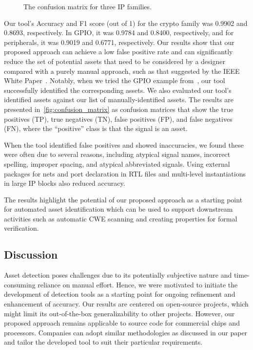 \begin{figure}[t]
\centering
{}\hfill
{}\hfill
{}
\caption{The confusion matrix for three IP families.\label{fig:confusion_matrix}
}
\end{figure}

Our tool's Accuracy and F1 score (out of 1) for the crypto family was 0.9902 and  0.8693, respectively. In GPIO, it was 0.9784 and 0.8400, respectively, and for peripherals, it was 0.9019 and 0.6771, respectively. 
Our results show that our proposed approach can achieve a low false positive rate and can significantly reduce the set of potential assets that need to be considered by a designer compared with a purely manual approach, such as that suggested by the IEEE White Paper~\cite{ieee_p3164_working_group_asset_2024}.
Notably, when we tried the GPIO example from~\cite{ieee_p3164_working_group_asset_2024}, our tool successfully identified the corresponding assets. 
We also evaluated our tool's identified assets against our list of manually-identified assets. 
The results are presented in~\autoref{fig:confusion_matrix} as confusion matrices that show the true positives (TP), true negatives (TN), false positives (FP), and false negatives (FN), where the ``positive'' class is that the signal is an asset. 

When the tool identified false positives and showed inaccuracies, we found these were often due to several reasons, including atypical signal names, incorrect spelling, improper spacing, and atypical abbreviated signals. 
Using external packages for nets and port declaration in RTL files and multi-level instantiations in large IP blocks also reduced accuracy.

The results highlight the potential of our proposed approach as a starting point for automated asset identification which can be used to support downstream activities such as automatic CWE scanning and creating properties for formal verification.

\subsection{Discussion \label{subsection:discussion}}
Asset detection poses challenges due to its potentially subjective nature and time-consuming reliance on manual effort. 
Hence, we were motivated to initiate the development of detection tools as a starting point for ongoing refinement and enhancement of accuracy.
Our results are centered on open-source projects, which might limit its out-of-the-box generalizability to other projects. 
However, our proposed approach remains applicable to 
source code for commercial chips and processors. 
Companies can adopt similar methodologies as discussed in our paper and tailor the developed tool to suit their particular requirements. 

